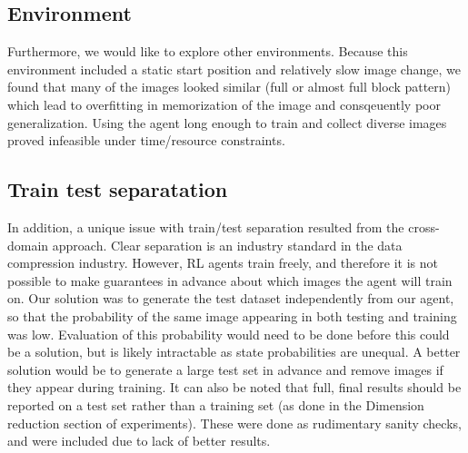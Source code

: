 \subsection{Environment}
Furthermore, we would like to explore other environments. Because this
environment included a static start position and relatively slow image change,
we found that many of the images looked similar (full or almost full block
pattern) which lead to overfitting in memorization of the image and consqeuently
poor generalization. Using the agent long enough to train and collect diverse
images proved infeasible under time/resource constraints.

\subsection{Train test separatation}
In addition, a unique issue with train/test separation resulted from the
cross-domain approach. Clear separation is an industry standard in the data
compression industry. However, RL agents train freely, and therefore it is not
possible to make guarantees in advance about which images the agent will train
on. Our solution was to generate the test dataset independently from our agent,
so that the probability of the same image appearing in both testing and training
was low. Evaluation of this probability would need to be done before this could
be a solution, but is likely intractable as state probabilities are unequal. A
better solution would be to generate a large test set in advance and remove
images if they appear during training. It can also be noted that full, final
results should be reported on a test set rather than a training set (as done in
the Dimension reduction section of experiments). These were done as rudimentary
sanity checks, and were included due to lack of better results.
